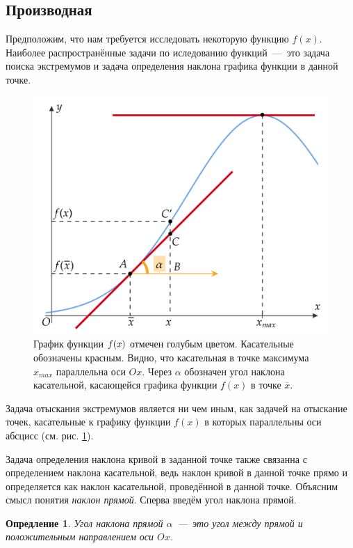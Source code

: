 \documentclass[12pt]{article}
\newtheorem{definition}{Опредление}[section]
\begin{document}
\subsection{Производная}
Предположим, что нам требуется исследовать некоторую функцию $f(x)$. Наиболее распространённые задачи по иследованию функций~\----~это задача поиска экстремумов и задача определения наклона графика функции в данной точке.
\begin{figure}
    \centering
    \includegraphics[width = 1\textwidth]{fig1.png}
    \caption{График функции $f\qty(x)$ отмечен голубым цветом. Касательные обозначены красным. Видно, что касательная в точке максимума $x_{max}$ параллельна оси $Ox$. Через $\alpha$ обозначен угол наклона касательной, касающейся графика функции $f(x)$ в точке $\overline{x}$.}
    \label{fig:1}
\end{figure}
\par
Задача отыскания экстремумов является ни чем иным, как задачей на отыскание точек, касательные к графику функции $f(x)$ в которых параллельны оси абсцисс (см. рис. \ref{fig:1}).
\par
Задача определения наклона кривой в заданной точке также связанна с определением наклона касательной, ведь наклон кривой в данной точке прямо и определяется как наклон касательной, проведённой в данной точке. Объясним смысл понятия \emph{наклон прямой}. Сперва введём угол наклона прямой.
\begin{definition}
Угол наклона прямой $\alpha$~\----~это угол между прямой и положительным направлением оси $Ox$.
\end{definition}
\end{document}
